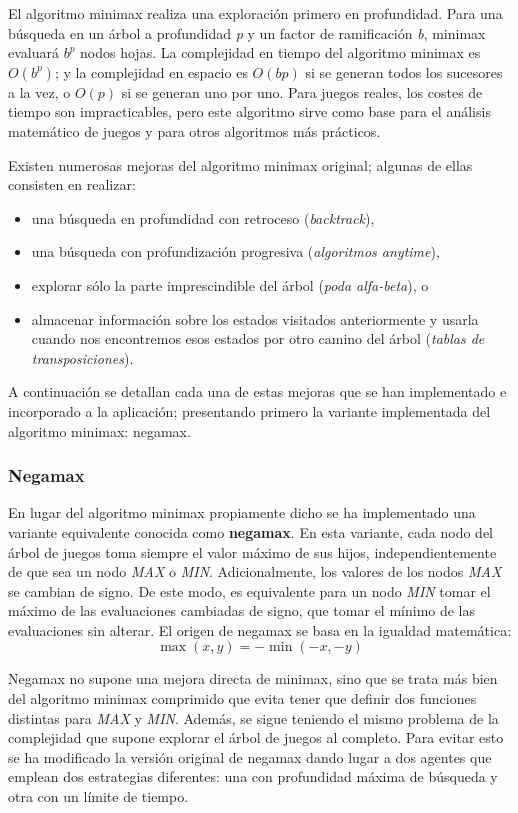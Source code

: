El algoritmo minimax realiza una exploración primero en profundidad.
Para una búsqueda en un árbol a profundidad \textit{p} y un factor de ramificación \textit{b}, minimax evaluará $b^p$ nodos hojas.
La complejidad en tiempo del algoritmo minimax es $O(b^p)$; y la complejidad en espacio es $O(bp)$ si se generan todos los sucesores a la vez, o $O(p)$ si se generan uno por uno.
Para juegos reales, los costes de tiempo son impracticables, pero este algoritmo sirve como base para el análisis matemático de juegos y para otros algoritmos más prácticos.

Existen numerosas mejoras del algoritmo minimax original; algunas de ellas consisten en realizar:
\begin{itemize}
	\item una búsqueda en profundidad con retroceso (\textit{backtrack}),
	\item una búsqueda con profundización progresiva (\textit{algoritmos anytime}),
	\item explorar sólo la parte imprescindible del árbol (\textit{poda alfa-beta}), o
	\item almacenar información sobre los estados visitados anteriormente  y usarla cuando nos encontremos esos estados por otro camino del árbol (\textit{tablas de transposiciones}).
\end{itemize}
A continuación se detallan cada una de estas mejoras que se han implementado e incorporado a la aplicación; presentando primero la variante implementada del algoritmo minimax: negamax.

\subsubsection{Negamax}
\label{sssec:negamax}
En lugar del algoritmo minimax propiamente dicho se ha implementado una variante equivalente conocida como \textbf{negamax}.
En esta variante, cada nodo del árbol de juegos toma siempre el valor máximo de sus hijos, independientemente de que sea un nodo \textit{MAX} o \textit{MIN}.
Adicionalmente, los valores de los nodos \textit{MAX} se cambian de signo.
De este modo, es equivalente para un nodo \textit{MIN} tomar el máximo de las evaluaciones cambiadas de signo, que tomar el mínimo de las evaluaciones sin alterar.
El origen de negamax se basa en la igualdad matemática:
\begin{displaymath}
\max{(x, y)} = - \min{(-x, -y)}
\end{displaymath}

Negamax no supone una mejora directa de minimax, sino que se trata más bien del algoritmo minimax comprimido que evita tener que definir dos funciones distintas para \textit{MAX} y \textit{MIN}.
Además, se sigue teniendo el mismo problema de la complejidad que supone explorar el árbol de juegos al completo.
Para evitar esto se ha modificado la versión original de negamax dando lugar a dos agentes que emplean dos estrategias diferentes: una con profundidad máxima de búsqueda y otra con un límite de tiempo.

